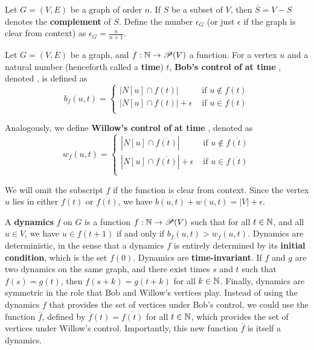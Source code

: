 \documentclass{article}
\newcommand{\ol}[1]{\overline{#1}}
\def\PS{\ensuremath\mathscr{P}}
\def\N{\ensuremath\mathbb{N}}
\theoremstyle{plain}
\theoremstyle{definition}
\begin{document}
Let $G = (V,E)$ be a graph of order $n$. If $S$ be a subset of $V$, then $\ol{S} = V-S$ denotes the \textbf{complement} of $S$. Define the number $\epsilon_G$ (or just $\epsilon$ if the graph is clear from context) as $\epsilon_G = \frac{n}{n+1}$.

Let $G=(V,E)$ be a graph, and $f: \N \rightarrow \PS(V)$ a function. For a vertex $u$ and a natural number (henceforth called a \textbf{time}) $t$, \textbf{Bob's control of}  \textbf{at time} , denoted , is defined as
\[
b_f(u,t) = 
\begin{cases}
	|N[u] \cap f(t)| &\text{ if } u\notin f(t)\\
	|N[u] \cap f(t)| + \epsilon &\text{ if } u\in f(t)\\
\end{cases}
\]

Analogously, we define \textbf{Willow's control of}  \textbf{at time} , denoted  as
\[
w_f(u,t) = 
\begin{cases}
|N[u] \cap \ol{f(t)}| &\text{ if } u\notin \ol{f(t)}\\
|N[u] \cap \ol{f(t)}| + \epsilon &\text{ if } u\in \ol{f(t)}\\
\end{cases}
\]

We will omit the subscript $f$ if the function is clear from context.
Since the vertex $u$ lies in either $f(t)$ or $\ol{f(t)}$, we have $b(u,t) + w(u,t) = |V| + \epsilon$.

A \textbf{dynamics} $f$ on $G$ is a function $f: \N \rightarrow \PS(V)$ such that for all $t \in \N$, and all $u\in V$, we have $u\in f(t+1)$ if and only if $b_f(u,t) > w_f(u,t)$. Dynamics are deterministic, in the sense that a dynamics $f$ is entirely determined by its \textbf{initial condition}, which is the set $f(0)$. Dynamics are \textbf{time-invariant}. If $f$ and $g$ are two dynamics on the same graph, and there exist times $s$ and $t$ such that $f(s) = g(t)$, then $f(s + k) = g(t + k)$ for all $k\in \N$. Finally, dynamics are symmetric in the role that Bob and Willow's vertices play. Instead of using the dynamics $f$ that provides the set of vertices under Bob's control, we could use the function $\overline{f}$, defined by $\overline{f}(t) = \overline{f(t)}$ for all $t\in \N$, which provides the set of vertices under Willow's control. Importantly, this new function $\ol{f}$ is itself a dynamics.

\end{document}
